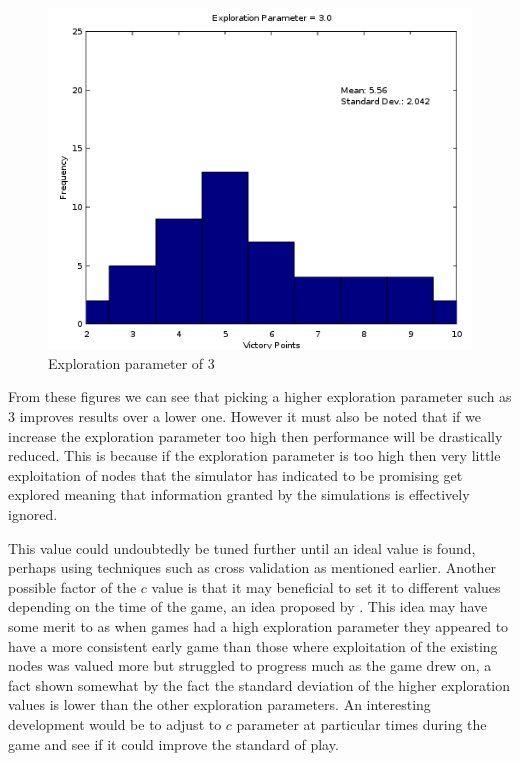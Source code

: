 \documentclass[]{article}
\begin{document}
\begin{center}
\begin{figure}[H]
 \centerline{\includegraphics[width=0.75\linewidth]{figures/exploration3.png}}
  \caption{Exploration parameter of 3}
  \label{fig:explore3} 
\end{figure}
\end{center}

\par From these figures we can see that picking a higher exploration parameter such as 3 improves results over a lower one. However it must also be noted that if we increase the exploration parameter too high then performance will be drastically reduced. This is because if the exploration parameter is too high then very little exploitation of nodes that the simulator has indicated to be promising get explored meaning that information granted by the simulations is effectively ignored.

\par This value could undoubtedly be tuned further until an ideal value is found, perhaps using techniques such as cross validation as mentioned earlier. Another possible factor of the $c$ value is that it may beneficial to set it to different values depending on the time of the game, an idea proposed by \textcite{roelofs2012monte}. This idea may have some merit to as when games had a high exploration parameter they appeared to have a more consistent early game than those where exploitation of the existing nodes was valued more but struggled to progress much as the game drew on, a fact shown somewhat by the fact the standard deviation of the higher exploration values is lower than the other exploration parameters. An interesting development would be to adjust to $c$ parameter at particular times during the game and see if it could improve the standard of play.
\end{document}
